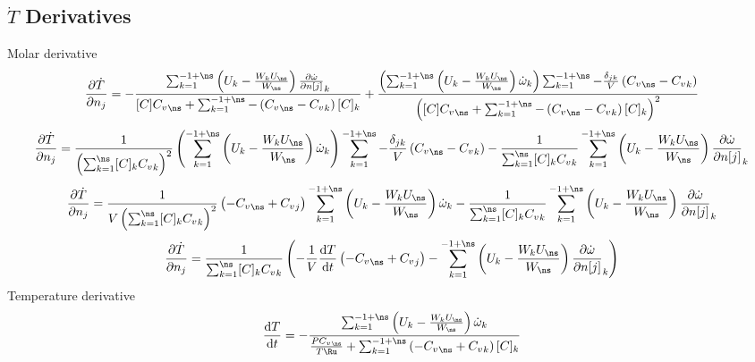 \documentclass[a4paper,10pt]{article}
\begin{document}
\subsection{\texorpdfstring{$\dot{T}$}{dTdt} Derivatives}
Molar derivative
\begin{dmath} \frac{\partial\dot{T}}{\partial{n_j}} = - \frac{\sum_{k=1}^{-1 + \ns} \left(U_{k} - \frac{W_{k} U_{\ns}}{W_{\ns}}\right) \frac{\partial \dot{\omega} }{\partial n[j] }_{k}}{[C] {C_v}_{\ns} + \sum_{k=1}^{-1 + \ns} - \left({C_v}_{\ns} - {C_v}_{k}\right) [C]_{k}} + \frac{\left(\sum_{k=1}^{-1 + \ns} \left(U_{k} - \frac{W_{k} U_{\ns}}{W_{\ns}}\right) \dot{\omega}_{k}\right) \sum_{k=1}^{-1 + \ns} - \frac{\delta_{j k}}{V} \left({C_v}_{\ns} - {C_v}_{k}\right)}{\left([C] {C_v}_{\ns} + \sum_{k=1}^{-1 + \ns} - \left({C_v}_{\ns} - {C_v}_{k}\right) [C]_{k}\right)^{2}}\end{dmath} 
\begin{dmath} \frac{\partial\dot{T}}{\partial{n_j}} = \frac{1}{\left(\sum_{k=1}^{\ns} [C]_{k} {C_v}_{k}\right)^{2}} \left(\sum_{k=1}^{-1 + \ns} \left(U_{k} - \frac{W_{k} U_{\ns}}{W_{\ns}}\right) \dot{\omega}_{k}\right) \sum_{k=1}^{-1 + \ns} - \frac{\delta_{j k}}{V} \left({C_v}_{\ns} - {C_v}_{k}\right) - \frac{1}{\sum_{k=1}^{\ns} [C]_{k} {C_v}_{k}} \sum_{k=1}^{-1 + \ns} \left(U_{k} - \frac{W_{k} U_{\ns}}{W_{\ns}}\right) \frac{\partial \dot{\omega} }{\partial n[j] }_{k}\end{dmath} 
\begin{dmath} \frac{\partial\dot{T}}{\partial{n_j}} = \frac{1}{V \left(\sum_{k=1}^{\ns} [C]_{k} {C_v}_{k}\right)^{2}} \left(- {C_v}_{\ns} + {C_v}_{j}\right) \sum_{k=1}^{-1 + \ns} \left(U_{k} - \frac{W_{k} U_{\ns}}{W_{\ns}}\right) \dot{\omega}_{k} - \frac{1}{\sum_{k=1}^{\ns} [C]_{k} {C_v}_{k}} \sum_{k=1}^{-1 + \ns} \left(U_{k} - \frac{W_{k} U_{\ns}}{W_{\ns}}\right) \frac{\partial \dot{\omega} }{\partial n[j] }_{k}\end{dmath} 
\begin{dmath} \frac{\partial\dot{T}}{\partial{n_j}} = \frac{1}{\sum_{k=1}^{\ns} [C]_{k} {C_v}_{k}} \left(- \frac{1}{V} \frac{\text{d} T }{\text{d} t } \left(- {C_v}_{\ns} + {C_v}_{j}\right) - \sum_{k=1}^{-1 + \ns} \left(U_{k} - \frac{W_{k} U_{\ns}}{W_{\ns}}\right) \frac{\partial \dot{\omega} }{\partial n[j] }_{k}\right)\end{dmath} 
Temperature derivative
\begin{dmath} \frac{\text{d} T }{\text{d} t } = - \frac{\sum_{k=1}^{-1 + \ns} \left(U_{k} - \frac{W_{k} U_{\ns}}{W_{\ns}}\right) \dot{\omega}_{k}}{\frac{P {C_v}_{\ns}}{T \Ru} + \sum_{k=1}^{-1 + \ns} \left(- {C_v}_{\ns} + {C_v}_{k}\right) [C]_{k}}\end{dmath} 
\end{document}
